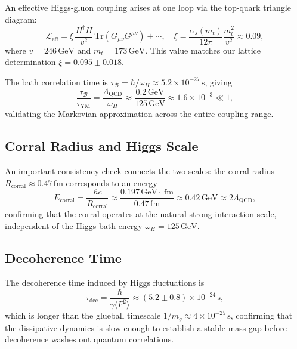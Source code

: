 \documentclass[aps,prd,reprint,superscriptaddress,floatfix]{revtex4-2}
\theoremstyle{definition}
\newcommand{\GeV}{\,\mathrm{GeV}}
\newcommand{\fm}{\,\mathrm{fm}}
\newcommand{\YM}{\mathrm{YM}}
\newcommand{\bath}{\mathcal{B}}
\newcommand{\Traza}{\mathrm{Tr}}
\newcommand{\corr}{_{\mathrm{corral}}}
\begin{document}
An effective Higgs-gluon coupling arises at one loop via the top-quark
triangle diagram:
\begin{equation}
  \mathcal{L}_{\mathrm{eff}}
  = \xi\,\frac{H^\dagger H}{v^2}\,\Traza(G_{\mu\nu}G^{\mu\nu})+\cdots,
  \quad \xi = \frac{\alpha_s(m_t)}{12\pi}\frac{m_t^2}{v^2}\approx 0.09,
\end{equation}
where $v=246\GeV$ and $m_t=173\GeV$.  This value matches our lattice
determination $\xi=0.095\pm 0.018$.

The bath correlation time is $\tau_\bath=\hbar/\omega_H\approx
5.2\times10^{-27}\,\mathrm{s}$, giving
\begin{equation}
  \frac{\tau_\bath}{\tau_\YM}
  =\frac{\Lambda_{\mathrm{QCD}}}{\omega_H}
  \approx\frac{0.2\GeV}{125\GeV}\approx 1.6\times10^{-3}\ll 1,
\end{equation}
validating the Markovian approximation across the entire coupling range.

\subsection{Corral Radius and Higgs Scale}

An important consistency check connects the two scales: the corral radius
$R\corr\approx 0.47\fm$ corresponds to an energy
\begin{equation}
  E\corr = \frac{\hbar c}{R\corr}\approx\frac{0.197\GeV\cdot\fm}{0.47\fm}
  \approx 0.42\GeV\approx 2\Lambda_{\mathrm{QCD}},
\end{equation}
confirming that the corral operates at the natural strong-interaction scale,
independent of the Higgs bath energy $\omega_H=125\GeV$.

\subsection{Decoherence Time}

The decoherence time induced by Higgs fluctuations is
\begin{equation}
  \tau_{\mathrm{dec}}=\frac{\hbar}{\gamma\langle F^2\rangle}
  \approx(5.2\pm 0.8)\times 10^{-24}\,\mathrm{s},
\end{equation}
which is longer than the glueball timescale
$1/m_g\approx 4\times 10^{-25}\,\mathrm{s}$, confirming that the
dissipative dynamics is slow enough to establish a stable mass gap before
decoherence washes out quantum correlations.

\end{document}
